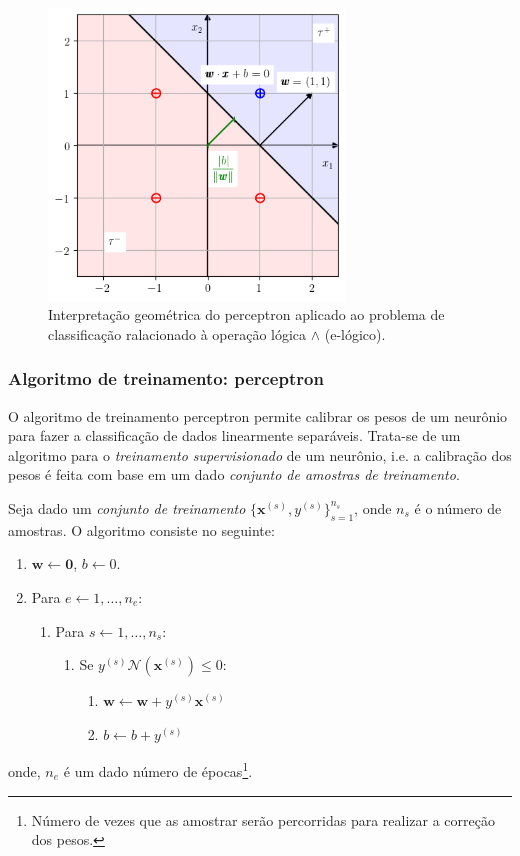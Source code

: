 \begin{figure}[H]
  \centering
  \includegraphics[width=0.7\textwidth]{./cap_perceptron/dados/fig_class_e/main}
  \caption{Interpretação geométrica do perceptron aplicado ao problema de classificação ralacionado à operação lógica $\land$ (e-lógico).}
  \label{fig:class_e}
\end{figure}

\subsubsection{Algoritmo de treinamento: perceptron}

O algoritmo de treinamento perceptron permite calibrar os pesos de um neurônio para fazer a classificação de dados linearmente separáveis. Trata-se de um algoritmo para o \emph{treinamento supervisionado} de um neurônio, i.e. a calibração dos pesos é feita com base em um dado \emph{conjunto de amostras de treinamento}.

Seja dado um \emph{conjunto de treinamento} $\{\pmb{x}^{(s)},y^{(s)}\}_{s=1}^{n_s}$, onde $n_s$ é o número de amostras. O algoritmo consiste no seguinte:
\begin{enumerate}
\item $\pmb{w} \leftarrow\pmb{0}$, $b \leftarrow 0$.
\item Para $e \leftarrow 1,\dotsc, n_e$:
  \begin{enumerate}
  \item Para $s \leftarrow 1,\dotsc, n_s$:
    \begin{enumerate}
    \item Se $y^{(s)}\mathcal{N}\left(\pmb{x}^{(s)}\right) \leq 0$:
      \begin{enumerate}
      \item $\pmb{w} \leftarrow \pmb{w}+y^{(s)}\pmb{x}^{(s)}$
      \item $b \leftarrow b + y^{(s)}$
      \end{enumerate}
    \end{enumerate}
  \end{enumerate}
\end{enumerate}
onde, $n_e$ é um dado número de épocas\footnote{Número de vezes que as amostrar serão percorridas para realizar a correção dos pesos.}.


